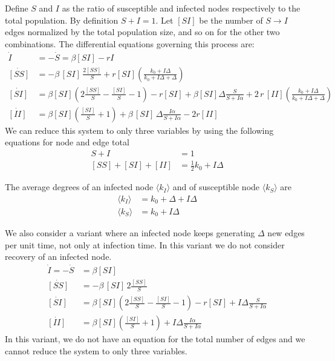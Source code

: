 \documentclass[11pt,final]{article}
\begin{document}
Define $S$ and $I$ as the ratio of susceptible and infected nodes respectively to the total population.
By definition $S+I=1$. Let $[SI]$ be the number of $S \to I$ edges normalized by the total population size,
and so on for the other two combinations.
The differential equations governing this process are:
\begin{equation}
    \begin{aligned}
\dot{I}&=-\dot{S}= \beta [SI] -rI \\
\dot{[SS]}&= -\beta \,[SI]\, \frac{2[SS]}{S} +r [SI] \left(\frac{k_{0}+I \Delta}{k_{0}+I \Delta +\Delta}\right) \\
\dot{[SI]}&= \beta[SI] \left( 2\frac{[SS]}{S} -\frac{[SI]}{S}-1 \right) -r[SI] +\beta[SI]\Delta \frac{S}{S+I\alpha}+2\,r\,[II]  \left(\frac{k_{0}+I \Delta}{k_{0}+I \Delta +\Delta}\right) \\
\dot{[II]}&= \beta[SI] \left(\frac{[SI]}{S} +1\right) +\beta\,[SI]\, \Delta \frac{I\alpha}{S+I\alpha} -2r [II]
    \end{aligned}
\end{equation}
We can reduce this system to only three variables by using the following equations for node and edge total
\begin{equation}\label{eq:closure}
    \begin{aligned}
S + I &= 1\\
[SS]+[SI]+[II] &= \tfrac12 k_0 + I\Delta
    \end{aligned}
\end{equation}

The average degrees of an infected node $\langle k_{I}\rangle$ and of susceptible node $\langle k_{S}\rangle$ are
\begin{equation}
    \begin{aligned}
\langle k_{I}\rangle&= k_{0}+\Delta +I\Delta\\
\langle k_{S}\rangle&= k_{0}+I \Delta
    \end{aligned}
\end{equation}

We also consider a variant where an infected node keeps generating $\Delta$ new edges per unit time,
not only at infection time. In this variant we do not consider recovery of an infected node.
\begin{equation}
    \begin{aligned}
\dot{I}=-\dot{S}&= \beta [SI] \\
\dot{[SS]}&= -\beta \,[SI]\, 2\frac{[SS]}{S} \\
\dot{[SI]}&= \beta[SI] \left( 2\frac{[SS]}{S} -\frac{[SI]}{S}-1 \right) -r[SI] + I \Delta \frac{S}{S+I\alpha} \\
\dot{[II]}&= \beta[SI] \left( \frac{[SI]}{S} +1 \right) +I \Delta \frac{I\alpha}{S+I\alpha}
    \end{aligned}
\end{equation}
In this variant, we do not have an equation for the total number of edges and we cannot reduce the system to only three variables.

{}

\end{document}
